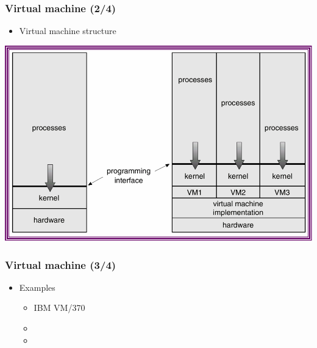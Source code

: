 \documentclass[CJKutf8,xcolor=pdftex,dvipsnames,table]{beamer}
\begin{document}
\begin{CJK*}{UTF8}{song}
  \begin{frame}
    \frametitle{Virtual machine (2/4)} \pause
    \begin{itemize}
    \item{Virtual machine structure} \pause
    \end{itemize}
    \begin{center}
      \includegraphics[scale=0.6]{v6f3-11} \pause
    \end{center}
  \end{frame}

  \begin{frame}
    \frametitle{Virtual machine (3/4)} \pause
    \begin{itemize}
    \item{Examples} \pause
      \begin{itemize}
      \item{IBM VM/370} \pause
      \item{} \pause
      \item{} \pause
      \end{itemize}
    \end{itemize}
  \end{frame}
  
  \iffalse


\end{CJK*}
\end{document}
